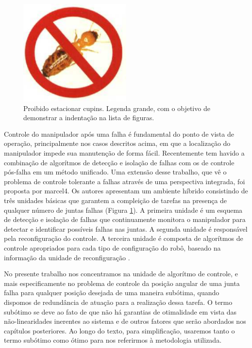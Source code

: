 \begin{figure}[ht]
\centering
\includegraphics[width=0.5\textwidth]{Cap1/cupim}
\caption{Proibido estacionar cupins. Legenda grande, com o objetivo de demonstrar a indentação na lista de figuras.}
\label{cupim}
\end{figure}

Controle do manipulador após uma falha é fundamental do ponto de vista de operação, principalmente nos casos descritos acima, em que a localização do manipulador impede sua manutenção de forma fácil. Recentemente tem havido a combinação
de algorítmos de detecção e isolação de falhas com os de controle pós-falha em um método unificado. Uma extensão desse trabalho, que vê o problema de controle tolerante a falhas através de uma perspectiva integrada, foi proposta por
{marcel4}. Os autores apresentam um ambiente híbrido consistindo de três unidades básicas que garantem a compleição de tarefas na presença de qualquer número de juntas falhas (Figura \ref{cupim}). A primeira unidade é um esquema de detecção
e isolação de falhas que continuamente monitora o manipulador para detectar e identificar possíveis falhas nas juntas. A segunda unidade é responsável pela reconfiguração do controle. A terceira unidade é composta de algorítmos de
controle apropriados para cada tipo de configuração do robô, baseado na informação da unidade de reconfiguração \cite{COFFEE2000}.

No presente trabalho nos concentramos na unidade de algorítmo de controle, e mais especificamente no problema de controle da posição  angular de uma junta falha para qualquer posição desejada de uma maneira subótima, quando dispomos
de redundância de atuação para a realização dessa tarefa. O termo subótimo se deve ao fato de que não há garantias de otimalidade em vista das não-linearidades inerentes ao sistema e de outros fatores que serão abordados nos capítulos posteriores. Ao longo do texto, para simplificação, usaremos tanto o termo subótimo como ótimo para nos referirmos à metodologia utilizada.

